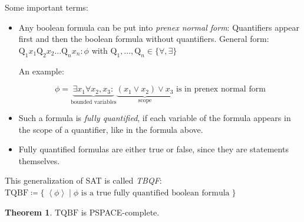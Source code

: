 \documentclass[10pt,fleqn]{article}
\theoremstyle{definition}
\newtheorem{theorem}{Theorem}
\theoremstyle{remark}
\newcommand{\tqbfprob}{\text{TQBF}}
\newcommand{\lpp}{\left \langle}
\newcommand{\rpp}{\right \rangle}
\newcommand{\enc}[1]{\lpp #1 \rpp}
\begin{document}
Some important terms:
\begin{itemize}
    \item Any boolean formula can be put into \emph{prenex normal form}: Quantifiers appear first and then the boolean formula without quantifiers. General form: \(\text{Q}_1x_1\text{Q}_2x_2...\text{Q}_nx_n\colon\phi\) with \(\text{Q}_1,...,\text{Q}_n \in \{\forall,\exists\}\)
    
    An example:
    \begin{ceqn}
    \[
        \phi = \underbrace{\exists x_1 \forall x_2, x_3\colon}_{\text{bounded variables}} \underbrace{(x_1 \lor x_2) \lor x_3}_{\text{scope}} \text{ is in prenex normal form}
    \]
    \end{ceqn}
    \item Such a formula is \emph{fully quantified}, if each variable of the formula appears in the scope of a quantifier, like in the formula above.
    \item Fully quantified formulas are either true or false, since they are statements themselves.
\end{itemize}
This generalization of SAT is called \emph{TBQF}: \(
        \tqbfprob \coloneqq \{\; \enc{\phi} \mid \phi \text{ is a true fully quantified boolean formula}\;\}
    \)
\begin{theorem}
    \(
        \tqbfprob
    \) is PSPACE-complete.
\end{theorem}
\end{document}
